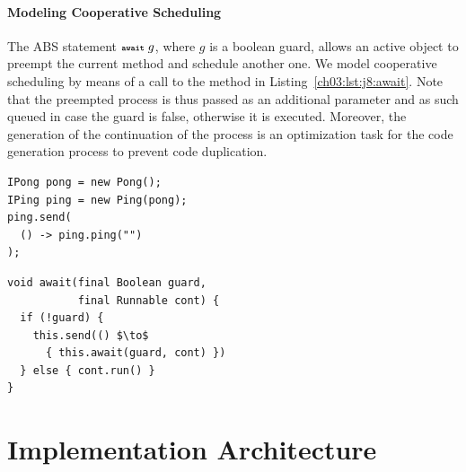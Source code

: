 \paragraph{Modeling Cooperative Scheduling}
The ABS statement $\textbf{\scriptsize\texttt{await}}\; g$, where $g$ is a boolean guard, allows an active object to preempt the current method and schedule another one.
We model cooperative scheduling by means of a call to the  method in Listing~\ref{ch03:lst:j8:await}.
Note that the preempted process is thus passed as an additional parameter and as such queued in case the guard is false,
otherwise it is executed.
Moreover, the generation of the continuation of the process is an optimization task for the code generation process to prevent code duplication.
\begin{center}
\begin{minipage}[t]{0.48\textwidth}
\begin{lstlisting}[mathescape,caption=main in ABS API,label=ch03:lst:main:api]
IPong pong = new Pong();
IPing ping = new Ping(pong);
ping.send(
  () -> ping.ping("")
);
\end{lstlisting}
\end{minipage}
\hfill
\begin{minipage}[t]{0.48\textwidth}
\begin{lstlisting}[mathescape,caption=Java~8 await implementation,label=ch03:lst:j8:await]
void await(final Boolean guard, 
           final Runnable cont) {
  if (!guard) { 
    this.send(() $\to$ 
      { this.await(guard, cont) })
  } else { cont.run() }
}
\end{lstlisting}
\end{minipage}
\end{center}





\section{Implementation Architecture}
\label{ch03:sec:impl:arch}

